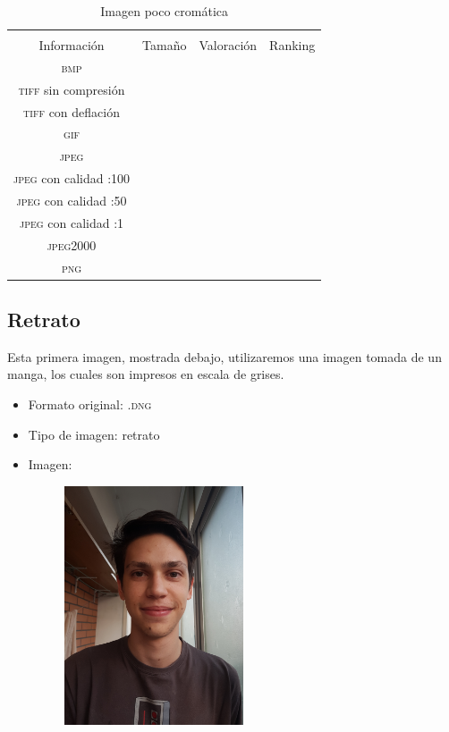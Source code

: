 \documentclass[11pt,a4paper]{article}
\begin{document}
\begin{table}[H]
\centering
\begin{tabular}{|c|c|c|c|}
\hline
\diagbox[width=15em]{\textit{Códec}/Formato}{\\Información} & Tamaño & Valoración & Ranking \\
\hline
\textsc{bmp} &  &  &  \\ \hline
\textsc{tiff} sin compresión &  &  &  \\ \hline
\textsc{tiff} con deflación &  &  &  \\ \hline
\textsc{gif} &  &  &  \\ \hline
\textsc{jpeg} &  &  &  \\ \hline
\textsc{jpeg} con calidad :100 &  &  &  \\ \hline
\textsc{jpeg} con calidad :50 &  &  &  \\ \hline
\textsc{jpeg} con calidad :1 &  &  &  \\ \hline
\textsc{jpeg2000} &  &  &  \\ \hline
\textsc{png} &  &  &  \\ \hline
\end{tabular}
\caption{Imagen poco cromática}
\label{tab:my-table}
\end{table}


\subsection{Retrato}

Esta primera imagen, mostrada debajo, utilizaremos una imagen tomada de un manga, los cuales son impresos en escala de grises.

\begin{itemize}
	\item Formato original: \textsc{.dng}
	\item Tipo de imagen: retrato
	\item Imagen:
		\begin{figure}[H]
		\centering
			\includegraphics[width=0.5\textwidth]{Fotos/retrato.jpg}
		\end{figure}	
\end{itemize}
\end{document}
